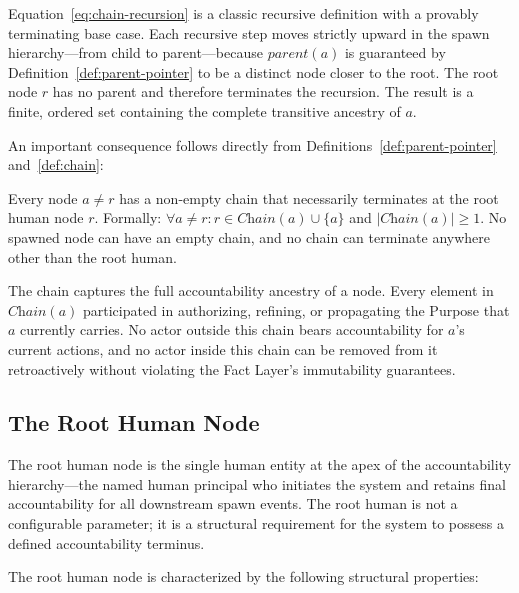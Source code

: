 Equation~\ref{eq:chain-recursion} is a classic recursive definition with a provably terminating base case. Each recursive step moves strictly upward in the spawn hierarchy—from child to parent—because $\textit{parent}(a)$ is guaranteed by Definition~\ref{def:parent-pointer} to be a distinct node closer to the root. The root node $r$ has no parent and therefore terminates the recursion. The result is a finite, ordered set containing the complete transitive ancestry of $a$.

An important consequence follows directly from Definitions~\ref{def:parent-pointer} and~\ref{def:chain}:

\begin{corrollary}
Every node $a \neq r$ has a non-empty chain that necessarily terminates at the root human node $r$. Formally: $\forall a \neq r: r \in \textit{Chain}(a) \cup \{a\}$ and $|\textit{Chain}(a)| \geq 1$. No spawned node can have an empty chain, and no chain can terminate anywhere other than the root human.
\end{corrollary}

The chain captures the full accountability ancestry of a node. Every element in $\textit{Chain}(a)$ participated in authorizing, refining, or propagating the Purpose that $a$ currently carries. No actor outside this chain bears accountability for $a$'s current actions, and no actor inside this chain can be removed from it retroactively without violating the Fact Layer's immutability guarantees.

\subsection{The Root Human Node}
\label{sec:root-human}

The root human node is the single human entity at the apex of the accountability hierarchy—the named human principal who initiates the system and retains final accountability for all downstream spawn events. The root human is not a configurable parameter; it is a structural requirement for the system to possess a defined accountability terminus.

The root human node is characterized by the following structural properties:

